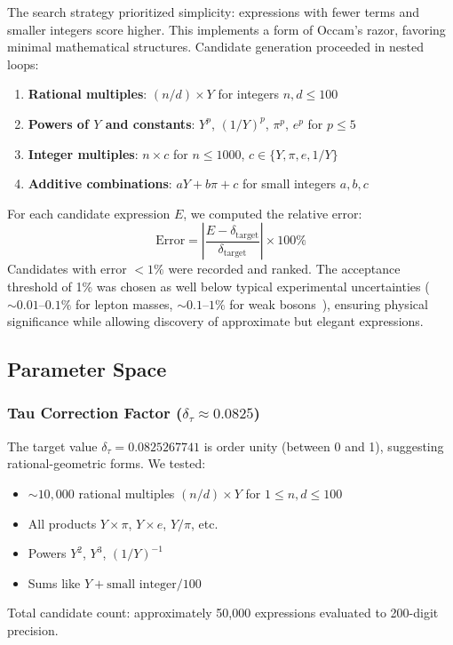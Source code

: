 \documentclass[11pt,a4paper]{article}
\begin{document}
The search strategy prioritized simplicity: expressions with fewer terms and smaller integers score higher. This implements a form of Occam's razor, favoring minimal mathematical structures. Candidate generation proceeded in nested loops:
\begin{enumerate}
\item \textbf{Rational multiples}: $(n/d) \times Y$ for integers $n, d \le 100$
\item \textbf{Powers of $Y$ and constants}: $Y^p$, $(1/Y)^p$, $\pi^p$, $e^p$ for $p \le 5$
\item \textbf{Integer multiples}: $n \times c$ for $n \le 1000$, $c \in \{Y, \pi, e, 1/Y\}$
\item \textbf{Additive combinations}: $a Y + b \pi + c$ for small integers $a, b, c$
\end{enumerate}

For each candidate expression $E$, we computed the relative error:
\begin{equation}
\text{Error} = \left| \frac{E - \delta_{\text{target}}}{\delta_{\text{target}}} \right| \times 100\%
\end{equation}
Candidates with error $<1\%$ were recorded and ranked. The acceptance threshold of 1\% was chosen as well below typical experimental uncertainties ($\sim 0.01$--$0.1\%$ for lepton masses, $\sim 0.1$--$1\%$ for weak bosons~\cite{ref007}), ensuring physical significance while allowing discovery of approximate but elegant expressions.

\subsection{Parameter Space}

\subsubsection{Tau Correction Factor ($\delta_\tau \approx 0.0825$)}

The target value $\delta_\tau = 0.0825267741$ is order unity (between 0 and 1), suggesting rational-geometric forms. We tested:
\begin{itemize}
\item $\sim 10{,}000$ rational multiples $(n/d) \times Y$ for $1 \le n, d \le 100$
\item All products $Y \times \pi$, $Y \times e$, $Y / \pi$, etc.
\item Powers $Y^2$, $Y^3$, $(1/Y)^{-1}$
\item Sums like $Y + \text{small integer}/100$
\end{itemize}
Total candidate count: approximately 50,000 expressions evaluated to 200-digit precision.
\end{document}
